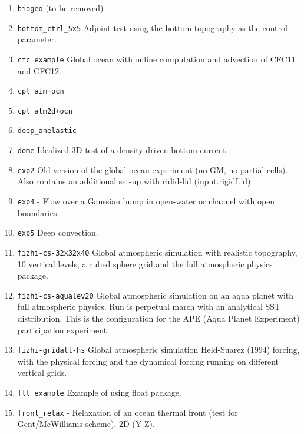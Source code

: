 \begin{enumerate}
\item \texttt{biogeo} (to be removed)

\item \texttt{bottom\_ctrl\_5x5} Adjoint test using the bottom
  topography as the control parameter.

\item \texttt{cfc\_example} Global ocean with online computation and
  advection of CFC11 and CFC12.

\item \texttt{cpl\_aim+ocn}

\item \texttt{cpl\_atm2d+ocn}

\item \texttt{deep\_anelastic}

\item \texttt{dome} Idealized 3D test of a density-driven bottom current.

\item \texttt{exp2} Old version of the global ocean experiment (no GM, 
      no partial-cells).\\
  Also contains an additional set-up with ridid-lid (input.rigidLid).

\item \texttt{exp4} - Flow over a Gaussian bump in open-water or
  channel with open boundaries.
  
\item \texttt{exp5} Deep convection.

\item \texttt{fizhi-cs-32x32x40} Global atmospheric simulation with
  realistic topography, 10 vertical levels, a cubed sphere grid and
  the full atmospheric physics package.

\item \texttt{fizhi-cs-aqualev20} Global atmospheric simulation on an
  aqua planet with full atmospheric physics. Run is perpetual march
  with an analytical SST distribution.  This is the configuration for
  the APE (Aqua Planet Experiment) participation experiment.

\item \texttt{fizhi-gridalt-hs} Global atmospheric simulation
  Held-Suarez (1994) forcing, with the physical forcing and the
  dynamical forcing running on different vertical grids.

\item \texttt{flt\_example} Example of using float package.
  
\item \texttt{front\_relax} - Relaxation of an ocean thermal front
  (test for Gent/McWilliams scheme). 2D (Y-Z).


\end{enumerate}
